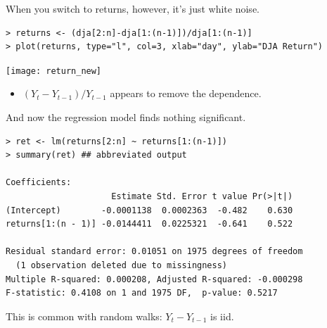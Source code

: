 \documentclass[12pt,xcolor=svgnames]{beamer}
\newcommand{\rd}{\color{red}}
\newcommand{\bl}{\color{blue}}
\newcommand{\nochap}{\vspace{0.5cm}}
\begin{document}
\begin{frame}[fragile]
\nochap

When you switch to returns, however, it's just white noise.

{\bl \scriptsize
\begin{verbatim}
> returns <- (dja[2:n]-dja[1:(n-1)])/dja[1:(n-1)]
> plot(returns, type="l", col=3, xlab="day", ylab="DJA Return")
\end{verbatim}
}

\begin{center}
\texttt{[image: return\_new]}
\end{center}

\vspace{-0.1cm}
\begin{itemize}
\item $(Y_t - Y_{t-1})/Y_{t-1}$ appears to remove the dependence.
\end{itemize}

\end{frame}

\begin{frame}[fragile]
\nochap

\vspace{-0.25cm}
And now the regression model finds nothing significant.

{\bl \footnotesize
\begin{verbatim}
> ret <- lm(returns[2:n] ~ returns[1:(n-1)])
> summary(ret) ## abbreviated output

Coefficients:
                     Estimate Std. Error t value Pr(>|t|)
(Intercept)        -0.0001138  0.0002363  -0.482    0.630
returns[1:(n - 1)] -0.0144411  0.0225321  -0.641    0.522

Residual standard error: 0.01051 on 1975 degrees of freedom
  (1 observation deleted due to missingness)
Multiple R-squared: 0.000208, Adjusted R-squared: -0.000298 
F-statistic: 0.4108 on 1 and 1975 DF,  p-value: 0.5217
\end{verbatim}
}

This is common with random walks: {\rd $Y_{t}- Y_{t-1}$ is iid}.
\end{frame}
\fi
\end{document}
